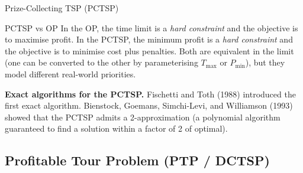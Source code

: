 \documentclass[aspectratio=169,10pt]{beamer}
\begin{document}
\begin{frame}[allowframebreaks]{Prize-Collecting TSP (PCTSP)}
  \medskip
  \begin{alertblock}{PCTSP vs OP}
    In the OP, the time limit is a \emph{hard constraint} and the objective
    is to maximise profit.
    In the PCTSP, the minimum profit is a \emph{hard constraint} and the
    objective is to minimise cost plus penalties.
    Both are equivalent in the limit (one can be converted to the other
    by parameterising $T_{\max}$ or $P_{\min}$), but they model different
    real-world priorities.
  \end{alertblock}

  \medskip
  \textbf{Exact algorithms for the PCTSP.}
  Fischetti and Toth (1988) introduced the first exact algorithm.
  Bienstock, Goemans, Simchi-Levi, and Williamson (1993) showed that
  the PCTSP admits a 2-approximation (a polynomial algorithm guaranteed
  to find a solution within a factor of 2 of optimal).

\end{frame}

\subsection{Profitable Tour Problem (PTP / DCTSP)}
\end{document}
